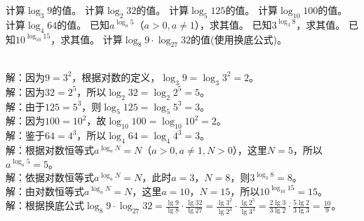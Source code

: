 \documentclass{ctexart}
\newenvironment{MyAnswer}[1][] %
{
    \begin{tcolorbox}[breakable, colframe=blue]
    \begin{Answer}[#1] \color{blue} \kaishu
        }  %
    {\end{Answer}
\end{tcolorbox}
}
\begin{document}
\begin{Exercise}[title={对数运算基础练习}, label={ex:basic_logarithm}]
    \Question 计算\(\log_3 9\)的值。
    \Question 计算\(\log_2 32\)的值。
    \Question 计算\(\log_5 125\)的值。
    \Question 计算\(\log_{10}100\)的值。
    \Question 计算\(\log_4 64\)的值。
    \Question 已知\(a^{\log_a 5}\)（\(a>0,a\neq1\)），求其值。
    \Question 已知\(3^{\log_3 8}\)，求其值。
    \Question 已知\(10^{\log_{10}15}\)，求其值。
    \Question 计算\(\log_8 9\cdot\log_{27}32\)的值(使用换底公式)。
\end{Exercise}
\begin{MyAnswer}[ref={ex:basic_logarithm}]
    \Question {}\\解：因为\(9 = 3^2\)，根据对数的定义，\(\log_3 9=\log_3 3^2 = 2\)。
    \Question {}\\解：因为\(32 = 2^5\)，所以\(\log_2 32=\log_2 2^5 = 5\)。
    \Question {}\\解：由于\(125 = 5^3\)，则\(\log_5 125=\log_5 5^3 = 3\)。
    \Question {}\\解：因为\(100 = 10^2\)，故\(\log_{10}100=\log_{10}10^2 = 2\)。
    \Question {}\\解：鉴于\(64 = 4^3\)，所以\(\log_4 64=\log_4 4^3 = 3\)。
    \Question {}\\解：根据对数恒等式\(a^{\log_a N}=N\)（\(a>0,a\neq1,N>0\)），这里\(N = 5\)，所以\(a^{\log_a 5}=5\)。
    \Question {}\\解：依据对数恒等式\(a^{\log_a N}=N\)，此时\(a = 3\)，\(N = 8\)，则\(3^{\log_3 8}=8\)。
    \Question {}\\解：由对数恒等式\(a^{\log_a N}=N\)，这里\(a = 10\)，\(N = 15\)，所以\(10^{\log_{10}15}=15\)。
    \Question {}\\解：根据换底公式\(\log_8 9\cdot\log_{27}32=\frac{\lg 9}{\lg 8}\cdot\frac{\lg 32}{\lg 27}=\frac{\lg 3^2}{\lg 2^3}\cdot\frac{\lg 2^5}{\lg 3^3}=\frac{2\lg 3}{3\lg 2}\cdot\frac{5\lg 2}{3\lg 3}=\frac{10}{9}\)。
\end{MyAnswer}
\end{document}
